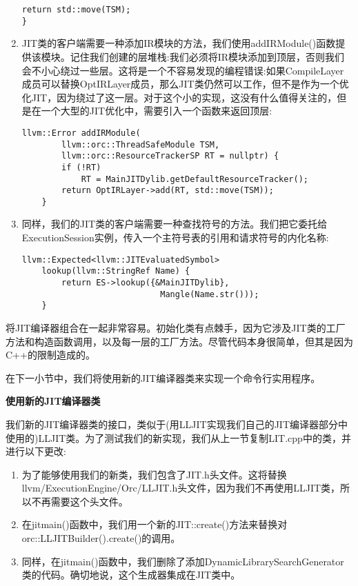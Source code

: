 \begin{enumerate}
\begin{lstlisting}[caption={}]
	return std::move(TSM);
}
\end{lstlisting}

\item JIT类的客户端需要一种添加IR模块的方法，我们使用addIRModule()函数提供该模块。记住我们创建的层堆栈:我们必须将IR模块添加到顶层，否则我们会不小心绕过一些层。这将是一个不容易发现的编程错误:如果CompileLayer成员可以替换OptIRLayer成员，那么JIT类仍然可以工作，但不是作为一个优化JIT，因为绕过了这一层。对于这个小的实现，这没有什么值得关注的，但是在一个大型的JIT优化中，需要引入一个函数来返回顶层:
\begin{lstlisting}[caption={}]
	llvm::Error addIRModule(
		llvm::orc::ThreadSafeModule TSM,
		llvm::orc::ResourceTrackerSP RT = nullptr) {
		if (!RT)
			RT = MainJITDylib.getDefaultResourceTracker();
		return OptIRLayer->add(RT, std::move(TSM));
	}
\end{lstlisting}

\item 同样，我们的JIT类的客户端需要一种查找符号的方法。我们把它委托给ExecutionSession实例，传入一个主符号表的引用和请求符号的内化名称:
\begin{lstlisting}[caption={}]
	llvm::Expected<llvm::JITEvaluatedSymbol>
	lookup(llvm::StringRef Name) {
		return ES->lookup({&MainJITDylib},
							Mangle(Name.str()));
	}
\end{lstlisting}

\end{enumerate}

将JIT编译器组合在一起非常容易。初始化类有点棘手，因为它涉及JIT类的工厂方法和构造函数调用，以及每一层的工厂方法。尽管代码本身很简单，但其是因为C++的限制造成的。\par

在下一小节中，我们将使用新的JIT编译器类来实现一个命令行实用程序。\par

\hspace*{\fill} \par %
\textbf{使用新的JIT编译器类}

我们新的JIT编译器类的接口，类似于(用LLJIT实现我们自己的JIT编译器部分中使用的)LLJIT类。为了测试我们的新实现，我们从上一节复制LIT.cpp中的类，并进行以下更改:\par

\begin{enumerate}
\item 为了能够使用我们的新类，我们包含了JIT.h头文件。这将替换llvm/ExecutionEngine/Orc/\allowbreak LLJIT.h头文件，因为我们不再使用LLJIT类，所以不再需要这个头文件。

\item 在jitmain()函数中，我们用一个新的JIT::create()方法来替换对orc::LLJITBuilder().create()的调用。

\item 同样，在jitmain()函数中，我们删除了添加DynamicLibrarySearchGenerator类的代码。确切地说，这个生成器集成在JIT类中。
\end{enumerate}

